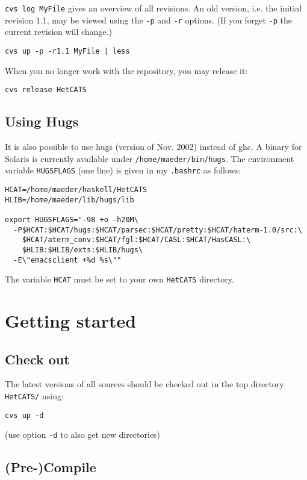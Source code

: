 \documentclass{article}
\begin{document}
\texttt{cvs log MyFile} gives an overview of all revisions. An old
version, i.e. the initial revision 1.1, may be viewed using the
\texttt{-p} and \texttt{-r} options. (If you forget \texttt{-p} the
current revision will change.)

\begin{verbatim}
cvs up -p -r1.1 MyFile | less
\end{verbatim}

When you no longer work with the repository, you may release it:

\begin{verbatim}
cvs release HetCATS
\end{verbatim}

\subsection{Using Hugs}

It is also possible to use hugs (version of Nov. 2002) instead of ghc.
A binary for Solaris is currently available under
\texttt{/home/maeder/bin/hugs}.  The environment variable
\texttt{HUGSFLAGS} (one line) is given in my \texttt{.bashrc} as follows:

\begin{verbatim}
HCAT=/home/maeder/haskell/HetCATS
HLIB=/home/maeder/lib/hugs/lib

export HUGSFLAGS="-98 +o -h20M\
  -P$HCAT:$HCAT/hugs:$HCAT/parsec:$HCAT/pretty:$HCAT/haterm-1.0/src:\
    $HCAT/aterm_conv:$HCAT/fgl:$HCAT/CASL:$HCAT/HasCASL:\
    $HLIB:$HLIB/exts:$HLIB/hugs\
  -E\"emacsclient +%d %s\""
\end{verbatim}

The variable \texttt{HCAT} must be set to your own \texttt{HetCATS} directory.

\section{Getting started}

\subsection{Check out}
The latest versions of all sources should be checked out in the top
directory \texttt{HetCATS/} using:

\texttt{cvs up -d}

(use option \texttt{-d} to also get new directories)

\subsection{(Pre-)Compile}
\end{document}
